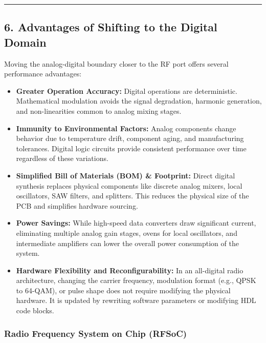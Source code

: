 \documentclass[
]{article}
\providecommand{\tightlist}{%
  \setlength{\itemsep}{0pt}\setlength{\parskip}{0pt}}
\begin{document}
\begin{center}\rule{0.5\linewidth}{0.5pt}\end{center}

\subsection{6. Advantages of Shifting to the Digital
Domain}\label{advantages-of-shifting-to-the-digital-domain}

Moving the analog-digital boundary closer to the RF port offers several
performance advantages:

\begin{itemize}
\tightlist
\item
  \textbf{Greater Operation Accuracy:} Digital operations are
  deterministic. Mathematical modulation avoids the signal degradation,
  harmonic generation, and non-linearities common to analog mixing
  stages.
\item
  \textbf{Immunity to Environmental Factors:} Analog components change
  behavior due to temperature drift, component aging, and manufacturing
  tolerances. Digital logic circuits provide consistent performance over
  time regardless of these variations.
\item
  \textbf{Simplified Bill of Materials (BOM) \& Footprint:} Direct
  digital synthesis replaces physical components like discrete analog
  mixers, local oscillators, SAW filters, and splitters. This reduces
  the physical size of the PCB and simplifies hardware sourcing.
\item
  \textbf{Power Savings:} While high-speed data converters draw
  significant current, eliminating multiple analog gain stages, ovens
  for local oscillators, and intermediate amplifiers can lower the
  overall power consumption of the system.
\item
  \textbf{Hardware Flexibility and Reconfigurability:} In an all-digital
  radio architecture, changing the carrier frequency, modulation format
  (e.g., QPSK to 64-QAM), or pulse shape does not require modifying the
  physical hardware. It is updated by rewriting software parameters or
  modifying HDL code blocks.
\end{itemize}

\subsubsection{Radio Frequency System on Chip
(RFSoC)}\label{radio-frequency-system-on-chip-rfsoc}
\end{document}
